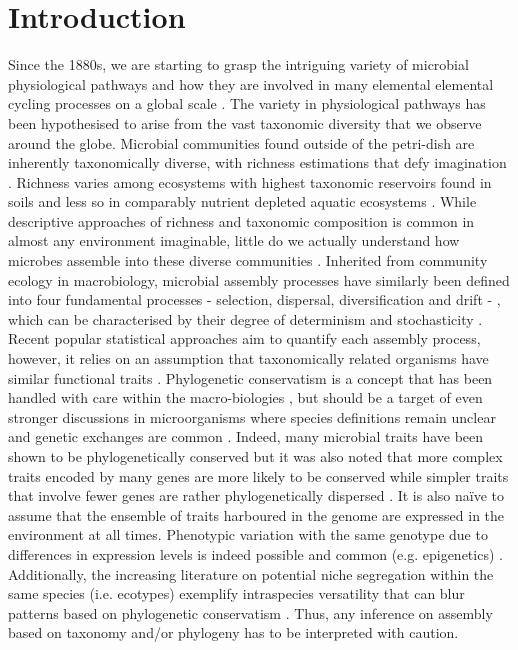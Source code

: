\documentclass[12pt,a4paper]{article} %
\begin{document}
\section*{Introduction}
Since the 1880s, we are starting to grasp the intriguing variety of microbial physiological pathways and how they are involved in many elemental elemental cycling processes on a global scale \citep{Caumette2015}. The variety in physiological pathways has been hypothesised to arise from the vast taxonomic diversity that we observe around the globe. Microbial communities found outside of the petri-dish are inherently taxonomically diverse, with richness estimations that defy imagination \citep{Thompson2017, Louca2019}. Richness varies among ecosystems with highest taxonomic reservoirs found in soils and less so in comparably nutrient depleted aquatic ecosystems \citep{Thompson2017}. While descriptive approaches of richness and taxonomic composition is common in almost any environment imaginable, little do we actually understand how microbes assemble into these diverse communities \citep{Shade2017a, Shade2018}. Inherited from community ecology in macrobiology, microbial assembly processes have similarly been defined into four fundamental processes - selection, dispersal, diversification and drift - \citep{Vellend2010}, which can be characterised by their degree of determinism and stochasticity \citep{Zhou2017}. Recent popular statistical approaches aim to quantify each assembly process, however, it relies on an assumption that taxonomically related organisms have similar functional traits \citep{Stegen2013a, Stegen2015a}. Phylogenetic conservatism is a concept that has been handled with care within the macro-biologies \citep{Losos2008, Warren2008}, but should be a target of even stronger discussions in microorganisms where species definitions remain unclear \citep{Achtman2008} and genetic exchanges are common \citep{Thomas2005}. Indeed, many microbial traits have been shown to be phylogenetically conserved \citep{Martiny2015} but it was also noted that more complex traits encoded by many genes are more likely to be conserved while simpler traits that involve fewer genes are rather phylogenetically dispersed \citep{Martiny2013a}. It is also na\"{i}ve to assume that the ensemble of traits harboured in the genome are expressed in the environment at all times. Phenotypic variation with the same genotype due to differences in expression levels is indeed possible and common (e.g. epigenetics) \citep{Caumette2015}. Additionally, the increasing literature on potential niche segregation within the same species (i.e. ecotypes) \citep{VanRossum2020} exemplify intraspecies versatility that can blur patterns based on phylogenetic conservatism \citep{Achtman2008, Ackermann2015, Chase2018}. Thus, any inference on assembly based on taxonomy and/or phylogeny has to be interpreted with caution.
\end{document}
